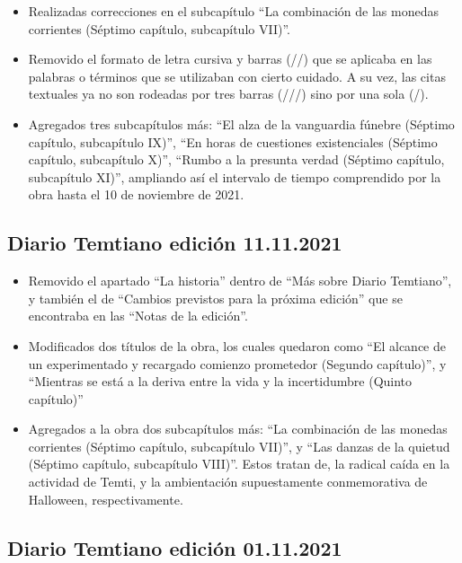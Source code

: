 \documentclass[
]{book}
\begin{document}
\begin{itemize}
\item
  Realizadas correcciones en el subcapítulo ``La combinación de las monedas corrientes (Séptimo capítulo, subcapítulo VII)''.
\item
  Removido el formato de letra cursiva y barras (//) que se aplicaba en las palabras o términos que se utilizaban con cierto cuidado. A su vez, las citas textuales ya no son rodeadas por tres barras (///) sino por una sola (/).
\item
  Agregados tres subcapítulos más: ``El alza de la vanguardia fúnebre (Séptimo capítulo, subcapítulo IX)'', ``En horas de cuestiones existenciales (Séptimo capítulo, subcapítulo X)'', ``Rumbo a la presunta verdad (Séptimo capítulo, subcapítulo XI)'', ampliando así el intervalo de tiempo comprendido por la obra hasta el 10 de noviembre de 2021.
\end{itemize}

\hypertarget{diario-temtiano-ediciuxf3n-11.11.2021}{%
\subsection*{Diario Temtiano edición 11.11.2021}\label{diario-temtiano-ediciuxf3n-11.11.2021}}

\begin{itemize}
\item
  Removido el apartado ``La historia'' dentro de ``Más sobre Diario Temtiano'', y también el de ``Cambios previstos para la próxima edición'' que se encontraba en las ``Notas de la edición''.
\item
  Modificados dos títulos de la obra, los cuales quedaron como ``El alcance de un experimentado y recargado comienzo prometedor (Segundo capítulo)'', y ``Mientras se está a la deriva entre la vida y la incertidumbre (Quinto capítulo)''
\item
  Agregados a la obra dos subcapítulos más: ``La combinación de las monedas corrientes (Séptimo capítulo, subcapítulo VII)'', y ``Las danzas de la quietud (Séptimo capítulo, subcapítulo VIII)''. Estos tratan de, la radical caída en la actividad de Temti, y la ambientación supuestamente conmemorativa de Halloween, respectivamente.
\end{itemize}

\hypertarget{diario-temtiano-ediciuxf3n-01.11.2021}{%
\subsection*{Diario Temtiano edición 01.11.2021}\label{diario-temtiano-ediciuxf3n-01.11.2021}}
\end{document}
